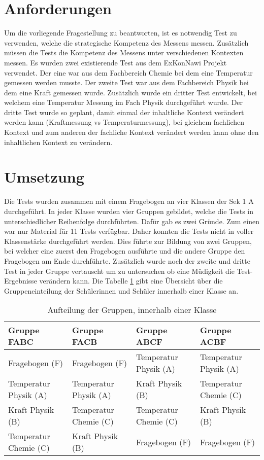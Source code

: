 
\section{Anforderungen}

Um die vorliegende Fragestellung zu beantworten, ist es notwendig Test zu verwenden, welche die strategische Kompetenz des Messens messen. Zusätzlich müssen die Tests die Kompetenz des Messens unter verschiedenen Kontexten messen. Es wurden zwei existierende Test aus dem ExKonNawi Projekt verwendet. Der eine war aus dem Fachbereich Chemie bei dem eine Temperatur gemessen werden musste. Der zweite Test war aus dem Fachbereich Physik bei dem eine Kraft gemessen wurde. Zusätzlich wurde ein dritter Test entwickelt, bei welchem eine Temperatur Messung im Fach Physik durchgeführt wurde. Der dritte Test wurde so geplant, damit einmal der inhaltliche Kontext verändert werden kann (Kraftmessung vs Temperaturmessung), bei gleichem fachlichen Kontext und zum anderen der fachliche Kontext verändert werden kann ohne den inhaltlichen Kontext zu verändern. 


\section{Umsetzung}

Die Tests wurden zusammen mit einem Fragebogen an vier Klassen der Sek 1 A durchgeführt. In jeder Klasse wurden vier Gruppen gebildet, welche die Tests in unterschiedlicher Reihenfolge durchführten. Dafür gab es zwei Gründe. Zum einen war nur Material für 11 Tests verfügbar. Daher konnten die Tests nicht in voller Klassenstärke durchgeführt werden. Dies führte zur Bildung von zwei Gruppen, bei welcher eine zuerst den Fragebogen ausführte und die andere Gruppe den Fragebogen am Ende durchführte. Zusätzlich wurde noch der zweite und dritte Test in jeder Gruppe vertauscht um zu untersuchen ob eine Müdigkeit die Test-Ergebnisse verändern kann. Die Tabelle \ref{tab:Gruppenaufteilung} gibt eine Übersicht über die Gruppeneinteilung der Schülerinnen und Schüler innerhalb einer Klasse an.
\begin{table}[htbp]
  \centering
  \begin{tabular}{|p{3.1cm}|p{3.1cm}|p{3.1cm}|p{3.1cm}|}
  \hline Gruppe FABC & Gruppe FACB & Gruppe ABCF & Gruppe ACBF \\ 
  \hline Fragebogen (F) & Fragebogen (F) & Temperatur Physik (A) & Temperatur Physik (A) \\ 
  \hline Temperatur Physik (A) & Temperatur Physik (A) & Kraft Physik (B) & Temperatur Chemie (C) \\ 
  \hline Kraft Physik (B) & Temperatur Chemie (C) & Temperatur Chemie (C) & Kraft Physik (B) \\ 
  \hline Temperatur Chemie (C) & Kraft Physik (B) & Fragebogen (F) & Fragebogen (F) \\ 
  \hline 
  \end{tabular} 
  \caption{Aufteilung der Gruppen, innerhalb einer Klasse}
  \label{tab:Gruppenaufteilung}
\end{table}

